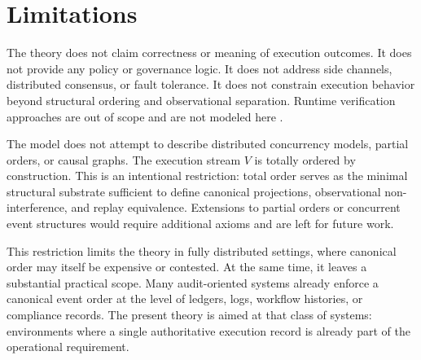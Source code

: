 \section{Limitations}

The theory does not claim correctness or meaning of execution outcomes. It does not provide any policy or governance logic. It does not address side channels, distributed consensus, or fault tolerance. It does not constrain execution behavior beyond structural ordering and observational separation. Runtime verification approaches are out of scope and are not modeled here \cite{leucker2009brief}.

The model does not attempt to describe distributed concurrency models, partial orders, or causal graphs. The execution stream $V$ is totally ordered by construction. This is an intentional restriction: total order serves as the minimal structural substrate sufficient to define canonical projections, observational non-interference, and replay equivalence. Extensions to partial orders or concurrent event structures would require additional axioms and are left for future work.

This restriction limits the theory in fully distributed settings, where canonical order may itself be expensive or contested. At the same time, it leaves a substantial practical scope. Many audit-oriented systems already enforce a canonical event order at the level of ledgers, logs, workflow histories, or compliance records. The present theory is aimed at that class of systems: environments where a single authoritative execution record is already part of the operational requirement.
